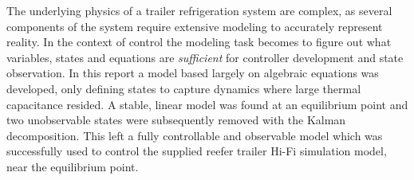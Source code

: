 





The underlying physics of a trailer refrigeration system are complex, as several components of the system require extensive modeling to accurately represent reality. In the context of control the modeling task becomes to figure out what variables, states and equations are \textit{sufficient} for controller development and state observation. In this report a model based largely on algebraic equations was developed, only defining states to capture dynamics where large thermal capacitance resided. A stable, linear model was found at an equilibrium point and two unobservable states were subsequently removed with the Kalman decomposition. This left a fully controllable and observable model which was successfully used to control the supplied reefer trailer Hi-Fi simulation model, near the equilibrium point.\\


